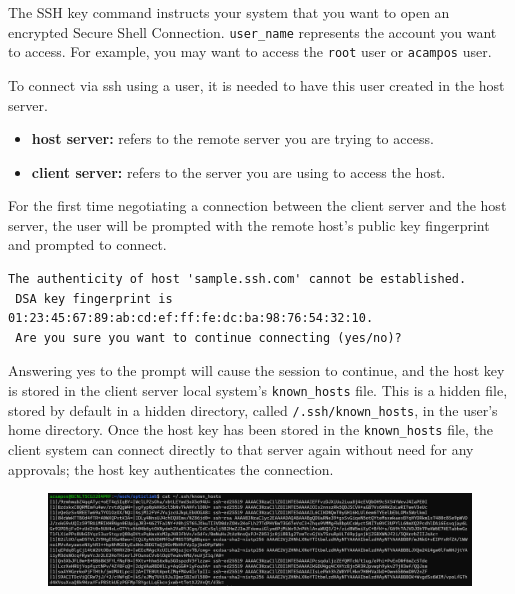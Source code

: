 \documentclass{article}
\newenvironment{blocktemplate}[1]{%
    \tcolorbox[beamer,%
    noparskip,breakable,
    colframe=Blue,%
    colbacklower=LimeGreen!75!LightGreen,%
    title=#1]}%
    {\endtcolorbox}
\newenvironment{codetemplate}[1][]{%
  \mybasecolorbox[#1]
  \itshape
}{%
  \endmybasecolorbox
}
\begin{document}
The SSH key command instructs your system that you want to open an encrypted Secure Shell Connection. \verb|user_name| represents the account you want to access. For example, you may want to access the \verb|root| user or \verb|acampos| user.

\begin{blocktemplate}{Note}
To connect via ssh using a user, it is needed to have this user created in the host server.

\begin{itemize}
    \item \textbf{host server:} refers to the remote server you are trying to access.
    \item \textbf{client server:} refers to the server you are using to access the host.
\end{itemize}
\end{blocktemplate}

For the first time negotiating a connection between the client server and the host server, the user will be prompted with the remote host's public key fingerprint and prompted to connect.

\begin{codetemplate}{}
\begin{verbatim}
The authenticity of host 'sample.ssh.com' cannot be established.
 DSA key fingerprint is 01:23:45:67:89:ab:cd:ef:ff:fe:dc:ba:98:76:54:32:10.
 Are you sure you want to continue connecting (yes/no)?
\end{verbatim}
\end{codetemplate}

Answering yes to the prompt will cause the session to continue, and the host key is stored in the client server local system's \verb|known_hosts| file. This is a hidden file, stored by default in a hidden directory, called \verb|/.ssh/known_hosts|, in the user's home directory. Once the host key has been stored in the \verb|known_hosts| file, the client system can connect directly to that server again without need for any approvals; the host key authenticates the connection.

\begin{figure}[H]
    \includegraphics[width=\textwidth]{pictures/ssh1.png}
    \centering
\end{figure}
\end{document}
